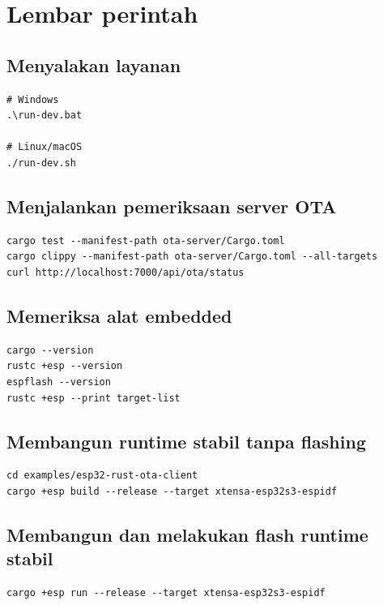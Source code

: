 \section{Lembar perintah}

\subsection{Menyalakan layanan}

\begin{lstlisting}[numbers=none]
# Windows
.\run-dev.bat

# Linux/macOS
./run-dev.sh
\end{lstlisting}

\subsection{Menjalankan pemeriksaan server OTA}

\begin{lstlisting}[numbers=none]
cargo test --manifest-path ota-server/Cargo.toml
cargo clippy --manifest-path ota-server/Cargo.toml --all-targets
curl http://localhost:7000/api/ota/status
\end{lstlisting}

\subsection{Memeriksa alat embedded}

\begin{lstlisting}[numbers=none]
cargo --version
rustc +esp --version
espflash --version
rustc +esp --print target-list
\end{lstlisting}

\subsection{Membangun runtime stabil tanpa flashing}

\begin{lstlisting}[numbers=none]
cd examples/esp32-rust-ota-client
cargo +esp build --release --target xtensa-esp32s3-espidf
\end{lstlisting}

\subsection{Membangun dan melakukan flash runtime stabil}

\begin{lstlisting}[numbers=none]
cargo +esp run --release --target xtensa-esp32s3-espidf
\end{lstlisting}


